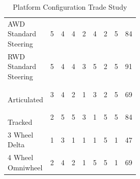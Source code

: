 \documentclass{article}
\begin{document}
\begin{table}[H]
\begin{adjustwidth}{-1in}{-1in}
\begin{tabular}{|l|c|c|c|c|c|c|c|c|}
		\makecell[l]{AWD \\ Standard \\ Steering}    & 5     & 4                & 4         & 2                   & 4                 & 2                                          & 5                             & 84    \\ \hdashline
		\makecell[l]{RWD \\ Standard \\ Steering} & 5     & 4                & 4         & 3                   & 5                 & 2                                          & 5                             & 91    \\ \hdashline
		\makecell[l]{ \\ Articulated \\ \quad }                       & 3     & 4                & 2         & 1                   & 3                 & 2                                          & 5                             & 69    \\ \hdashline
		\makecell[l]{\\ Tracked  \\ \quad}                          & 2     & 5                & 5         & 3                   & 1                 & 5                                          & 5                             & 84    \\ \hdashline
		\makecell[l]{3 Wheel \\ Delta}                      & 1     & 3                & 1         & 1                   & 1                 & 5                                          & 1                             & 47    \\ \hdashline
		\makecell[l]{4 Wheel \\ Omniwheel}                 & 2     & 4                & 2         & 1                   & 5                 & 5                                          & 1                             & 69    \\ \hline
		\end{tabular}
		\caption{Platform Configuration Trade Study}
		\label{my-label}
		\end{adjustwidth}
		\end{table}
		
\end{document}
